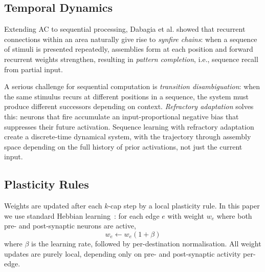 

\subsection{Temporal Dynamics}

Extending AC to sequential processing, Dabagia et al.\cite{dabagiaComputationSequencesAssemblies2024}
 showed that recurrent connections within an area naturally give rise to \textit{synfire chains}: when a sequence of stimuli is presented repeatedly, assemblies form at each position and forward recurrent weights strengthen, resulting in \textit{pattern completion}, i.e., sequence recall from partial input.

A serious challenge for sequential computation is \textit{transition disambiguation}: when the same stimulus recurs at different positions in a sequence, the system must produce different successors depending on context. \textit{Refractory adaptation} \cite{dabagiaComputationSequencesAssemblies2024}
solves this: neurons that fire accumulate an input-proportional negative bias that suppresses their future activation. Sequence learning with refractory adaptation create a discrete-time dynamical system, with the trajectory through assembly space depending on the full history of prior activations, not just the current input.


\subsection{Plasticity Rules}

Weights are updated after each $k$-cap step by a local plasticity rule. In this paper we use standard Hebbian learning~\cite{hebbOrganizationBehaviorNeuropsychological1949}: for each edge $e$ with weight $w_e$ where both pre- and post-synaptic neurons are active,
\begin{equation}\label{eq:hebbian}
    w_e \leftarrow w_e(1{+}\beta)
\end{equation}
where $\beta$ is the learning rate, followed by per-destination normalisation. All weight updates are purely local, depending only on pre- and post-synaptic activity per-edge.


